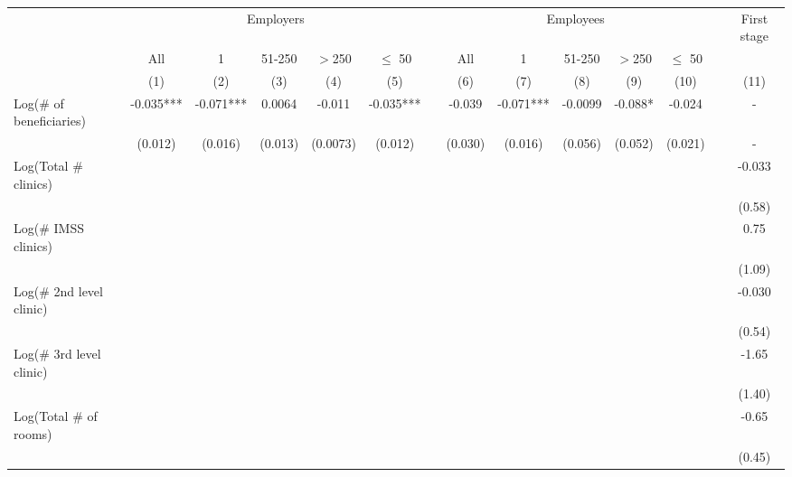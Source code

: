 \begin{tabular}{lccccccccccccc}
\toprule
      & \multicolumn{5}{c}{Employers }        &       & \multicolumn{5}{c}{Employees }        &       & First stage \\
\cmidrule{2-6}\cmidrule{8-12}\cmidrule{14-14}      & All   & 1     & 51-250 & $>$250 & $\leq$ 50 &       & All   & 1     & 51-250 & $>$250 & $\leq$ 50 &       &  \\
\midrule
      & (1)   & (2)   & (3)   & (4)   & (5)   &       & (6)   & (7)   & (8)   & (9)   & (10)  &       & (11) \\
\midrule
\midrule
Log(\# of beneficiaries) & -0.035*** & -0.071*** & 0.0064 & -0.011 & -0.035*** &       & -0.039 & -0.071*** & -0.0099 & -0.088* & -0.024 &       & - \\
      & (0.012) & (0.016) & (0.013) & (0.0073) & (0.012) &       & (0.030) & (0.016) & (0.056) & (0.052) & (0.021) &       & - \\
Log(Total \# clinics) &       &       &       &       &       &       &       &       &       &       &       &       & -0.033 \\
      &       &       &       &       &       &       &       &       &       &       &       &       & (0.58) \\
Log(\# IMSS clinics) &       &       &       &       &       &       &       &       &       &       &       &       & 0.75 \\
      &       &       &       &       &       &       &       &       &       &       &       &       & (1.09) \\
Log(\# 2nd level clinic) &       &       &       &       &       &       &       &       &       &       &       &       & -0.030 \\
      &       &       &       &       &       &       &       &       &       &       &       &       & (0.54) \\
Log(\# 3rd level clinic) &       &       &       &       &       &       &       &       &       &       &       &       & -1.65 \\
      &       &       &       &       &       &       &       &       &       &       &       &       & (1.40) \\
Log(Total \# of rooms) &       &       &       &       &       &       &       &       &       &       &       &       & -0.65 \\
      &       &       &       &       &       &       &       &       &       &       &       &       & (0.45) \\

\end{tabular}
